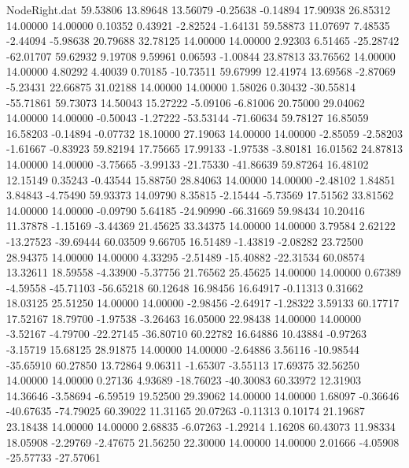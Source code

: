 \begin{filecontents}{NodeRight.dat}
  59.53806   13.89648   13.56079    -0.25638   -0.14894   17.90938   26.85312   14.00000   14.00000    0.10352    0.43921   -2.82524   -1.64131
  59.58873   11.07697    7.48535    -2.44094   -5.98638   20.79688   32.78125   14.00000   14.00000    2.92303    6.51465  -25.28742  -62.01707
  59.62932    9.19708    9.59961     0.06593   -1.00844   23.87813   33.76562   14.00000   14.00000    4.80292    4.40039    0.70185  -10.73511
  59.67999   12.41974   13.69568    -2.87069   -5.23431   22.66875   31.02188   14.00000   14.00000    1.58026    0.30432  -30.55814  -55.71861
  59.73073   14.50043   15.27222    -5.09106   -6.81006   20.75000   29.04062   14.00000   14.00000   -0.50043   -1.27222  -53.53144  -71.60634
  59.78127   16.85059   16.58203    -0.14894   -0.07732   18.10000   27.19063   14.00000   14.00000   -2.85059   -2.58203   -1.61667   -0.83923
  59.82194   17.75665   17.99133    -1.97538   -3.80181   16.01562   24.87813   14.00000   14.00000   -3.75665   -3.99133  -21.75330  -41.86639
  59.87264   16.48102   12.15149     0.35243   -0.43544   15.88750   28.84063   14.00000   14.00000   -2.48102    1.84851    3.84843   -4.75490
  59.93373   14.09790    8.35815    -2.15444   -5.73569   17.51562   33.81562   14.00000   14.00000   -0.09790    5.64185  -24.90990  -66.31669
  59.98434   10.20416   11.37878    -1.15169   -3.44369   21.45625   33.34375   14.00000   14.00000    3.79584    2.62122  -13.27523  -39.69444
  60.03509    9.66705   16.51489    -1.43819   -2.08282   23.72500   28.94375   14.00000   14.00000    4.33295   -2.51489  -15.40882  -22.31534
  60.08574   13.32611   18.59558    -4.33900   -5.37756   21.76562   25.45625   14.00000   14.00000    0.67389   -4.59558  -45.71103  -56.65218
  60.12648   16.98456   16.64917    -0.11313    0.31662   18.03125   25.51250   14.00000   14.00000   -2.98456   -2.64917   -1.28322    3.59133
  60.17717   17.52167   18.79700    -1.97538   -3.26463   16.05000   22.98438   14.00000   14.00000   -3.52167   -4.79700  -22.27145  -36.80710
  60.22782   16.64886   10.43884    -0.97263   -3.15719   15.68125   28.91875   14.00000   14.00000   -2.64886    3.56116  -10.98544  -35.65910
  60.27850   13.72864    9.06311    -1.65307   -3.55113   17.69375   32.56250   14.00000   14.00000    0.27136    4.93689  -18.76023  -40.30083
  60.33972   12.31903   14.36646    -3.58694   -6.59519   19.52500   29.39062   14.00000   14.00000    1.68097   -0.36646  -40.67635  -74.79025
  60.39022   11.31165   20.07263    -0.11313    0.10174   21.19687   23.18438   14.00000   14.00000    2.68835   -6.07263   -1.29214    1.16208
  60.43073   11.98334   18.05908    -2.29769   -2.47675   21.56250   22.30000   14.00000   14.00000    2.01666   -4.05908  -25.57733  -27.57061

\end{filecontents}
